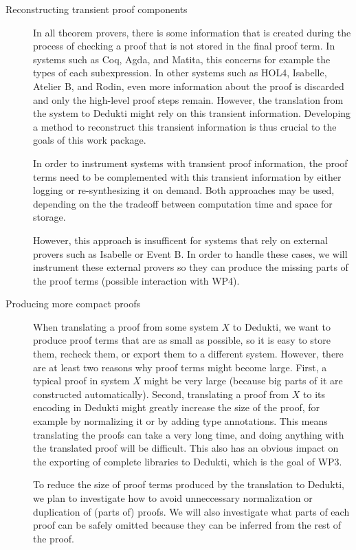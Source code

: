 \begin{description}
  \item[Reconstructing transient proof components] In all theorem
  provers, there is some information that is created during the
  process of checking a proof that is not stored in the final proof
  term. In systems such as Coq, Agda, and Matita, this concerns for
  example the types of each subexpression. In other systems such as
  HOL4, Isabelle, Atelier B, and Rodin, even more information about
  the proof is discarded and only the high-level proof steps remain.
  However, the translation from the system to Dedukti might rely on
  this transient information. Developing a method to reconstruct this
  transient information is thus crucial to the goals of this work
  package.

  In order to instrument systems with transient proof information, the
  proof terms need to be complemented with this transient information
  by either logging or re-synthesizing it on demand. Both approaches
  may be used, depending on the the tradeoff between computation time
  and space for storage.

  However, this approach is insufficent for systems that rely on
  external provers such as Isabelle or Event B. In order to handle
  these cases, we will instrument these external provers so they can
  produce the missing parts of the proof terms (possible interaction
  with WP4).

  \item[Producing more compact proofs] When translating a proof from
  some system $X$ to Dedukti, we want to produce proof terms that are
  as small as possible, so it is easy to store them, recheck them, or
  export them to a different system. However, there are at least two
  reasons why proof terms might become large. First, a typical proof
  in system $X$ might be very large (because big parts of it are
  constructed automatically). Second, translating a proof from $X$ to
  its encoding in Dedukti might greatly increase the size of the
  proof, for example by normalizing it or by adding type annotations.
  This means translating the proofs can take a very long time, and
  doing anything with the translated proof will be difficult. This
  also has an obvious impact on the exporting of complete libraries to
  Dedukti, which is the goal of WP3.

  To reduce the size of proof terms produced by the translation to
  Dedukti, we plan to investigate how to avoid unneccessary
  normalization or duplication of (parts of) proofs. We will also
  investigate what parts of each proof can be safely omitted because
  they can be inferred from the rest of the proof.
\end{description}

